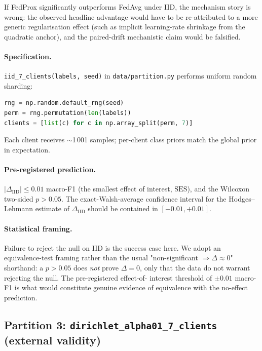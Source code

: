 If FedProx significantly outperforms FedAvg under IID, the
mechanism story is wrong: the observed headline advantage would
have to be re-attributed to a more generic regularisation effect
(such as implicit learning-rate shrinkage from the quadratic
anchor), and the paired-drift mechanistic claim would be falsified.

\paragraph{Specification.}
\texttt{iid\_7\_clients(labels, seed)} in \texttt{data/partition.py}
performs uniform random sharding:

\begin{lstlisting}[language=Python]
rng = np.random.default_rng(seed)
perm = rng.permutation(len(labels))
clients = [list(c) for c in np.array_split(perm, 7)]
\end{lstlisting}

Each client receives $\sim$1\,001 samples; per-client class priors
match the global prior in expectation.

\paragraph{Pre-registered prediction.}
$|\Delta_{\mathrm{IID}}| \leq 0.01$ macro-F1 (the smallest effect of
interest, $\mathrm{SES}$), and the Wilcoxon two-sided $p > 0.05$.
The exact-Walsh-average confidence interval for the
Hodges--Lehmann estimate of $\Delta_{\mathrm{IID}}$ should be
contained in $[-0.01, +0.01]$.

\paragraph{Statistical framing.}
Failure to reject the null on IID is the success case here. We
adopt an equivalence-test framing rather than the usual
"non-significant $\Rightarrow \Delta \approx 0$" shorthand: a
$p > 0.05$ does \emph{not} prove $\Delta = 0$, only that the data
do not warrant rejecting the null. The pre-registered effect-of-
interest threshold of $\pm 0.01$ macro-F1 is what would constitute
genuine evidence of equivalence with the no-effect prediction.

\subsection{Partition 3: \texttt{dirichlet\_alpha01\_7\_clients}
            (external validity)}
\label{sec:stat-het-dirichlet}

